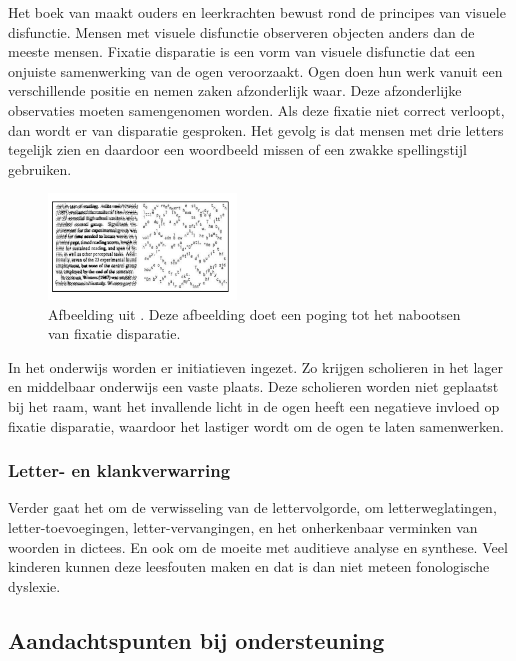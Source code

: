 Het boek van \textcite{Bezem2016} maakt ouders en leerkrachten bewust rond de principes van visuele disfunctie. Mensen met visuele disfunctie observeren objecten anders dan de meeste mensen. Fixatie disparatie is een vorm van visuele disfunctie dat een onjuiste samenwerking van de ogen veroorzaakt. Ogen doen hun werk vanuit een verschillende positie en nemen zaken afzonderlijk waar. Deze afzonderlijke observaties moeten samengenomen worden. Als deze fixatie niet correct verloopt, dan wordt er van disparatie gesproken. Het gevolg is dat mensen met drie letters tegelijk zien en daardoor een woordbeeld missen of een zwakke spellingstijl gebruiken.

\begin{figure}[H]
	\begin{center}
		\includegraphics[width=5cm]{img/visuele-disfunctie.png}
	\end{center}
	\caption{Afbeelding uit \textcite{Bezem2016}. Deze afbeelding doet een poging tot het nabootsen van fixatie disparatie. }
\end{figure}

In het onderwijs worden er initiatieven ingezet. Zo krijgen scholieren in het lager en middelbaar onderwijs een vaste plaats. Deze scholieren worden niet geplaatst bij het raam, want het invallende licht in de ogen heeft een negatieve invloed op fixatie disparatie, waardoor het lastiger wordt om de ogen te laten samenwerken. \autocite{Bezem2016}

\subsubsection{Letter- en klankverwarring}

Verder gaat het om de verwisseling van de lettervolgorde, om letterweglatingen, letter-toevoegingen, letter-vervangingen, en het onherkenbaar verminken van woorden in dictees. En ook om de moeite met auditieve analyse en synthese. Veel kinderen kunnen deze leesfouten maken en dat is dan niet meteen fonologische dyslexie.

\subsection{Aandachtspunten bij ondersteuning}


